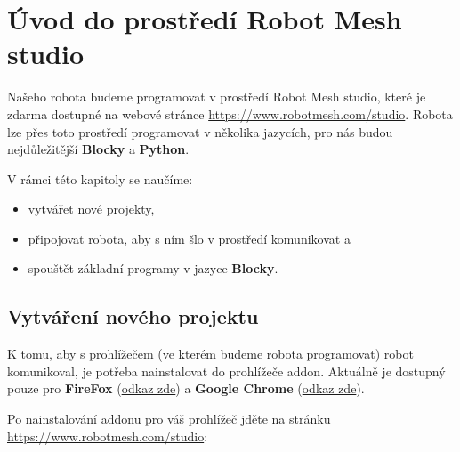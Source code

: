 \documentclass[../main.tex]{subfiles}
\begin{document}
	\section{Úvod do prostředí Robot Mesh studio}

	Našeho robota budeme programovat v prostředí Robot Mesh studio, které je zdarma dostupné na webové stránce \href{https://www.robotmesh.com/studio}{https://www.robotmesh.com/studio}. Robota lze přes toto prostředí programovat v několika jazycích, pro nás budou nejdůležitější \textbf{Blocky} a \textbf{Python}.

	V rámci této kapitoly se naučíme:
	\begin{itemize}
		\item vytvářet nové projekty,
		\item připojovat robota, aby s ním šlo v prostředí komunikovat a
		\item spouštět základní programy v jazyce \textbf{Blocky}.
	\end{itemize}

	\subsection{Vytváření nového projektu}
	K tomu, aby s prohlížečem (ve kterém budeme robota programovat) robot komunikoval, je potřeba nainstalovat do prohlížeče addon. Aktuálně je dostupný pouze pro \textbf{FireFox} (\href{https://addons.mozilla.org/en-US/firefox/addon/robot-mesh-connect/}{odkaz zde}) a \textbf{Google Chrome} (\href{https://chrome.google.com/webstore/detail/robot-mesh-connect-app/mapfkcmnklanficcnnjkgeneakedmjkp}{odkaz zde}).

	Po nainstalování addonu pro váš prohlížeč jděte na stránku \href{https://www.robotmesh.com/studio}{https://www.robotmesh.com/studio}:

	\begin{figure}[h!]
		\centering
	\end{figure}
\end{document}
